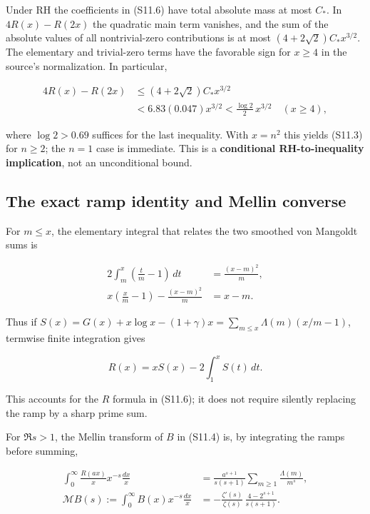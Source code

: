 \documentclass[
  10pt,
  a4paper,
  10pt,
  oneside,
  openany]{book}
\begin{document}
Under RH the coefficients in (S11.6) have total absolute mass at most
\(C_*\). In \(4R(x)-R(2x)\) the quadratic main term vanishes, and the
sum of the absolute values of all nontrivial-zero contributions is at
most \((4+2\sqrt2)C_*x^{3/2}\). The elementary and trivial-zero terms
have the favorable sign for \(x\ge4\) in the source's normalization. In
particular,

\[
\begin{aligned}
4R(x)-R(2x)
 &\le (4+2\sqrt2)C_*x^{3/2}\\
 &<6.83(0.047)x^{3/2}
 <\frac{\log2}{2}\,x^{3/2}
 \quad(x\ge4),
\end{aligned}
\tag{S11.10}\label{eq:S11.10}
\]

where \(\log2>0.69\) suffices for the last inequality. With \(x=n^2\)
this yields (S11.3) for \(n\ge2\); the \(n=1\) case is immediate. This
is a \textbf{conditional RH-to-inequality implication}, not an
unconditional bound.

\subsection{The exact ramp identity and Mellin
converse}\label{the-exact-ramp-identity-and-mellin-converse}

For \(m\le x\), the elementary integral that relates the two smoothed
von Mangoldt sums is

\[
\begin{aligned}
2\int_m^x\left(\frac{t}{m}-1\right)\,dt
 &=\frac{(x-m)^2}{m},\\
x\left(\frac{x}{m}-1\right)
 -\frac{(x-m)^2}{m}&=x-m.
\end{aligned}
\tag{S11.11}\label{eq:S11.11}
\]

Thus if
\(S(x)=G(x)+x\log x-(1+\gamma)x=\sum_{m\le x}\Lambda(m)(x/m-1)\),
termwise finite integration gives

\[
R(x)=xS(x)-2\int_1^x S(t)\,dt.
\tag{S11.12}\label{eq:S11.12}
\]

This accounts for the \(R\) formula in (S11.6); it does not require
silently replacing the ramp by a sharp prime sum.

For \(\Re s>1\), the Mellin transform of \(B\) in (S11.4) is, by
integrating the ramps before summing,

\[
\begin{aligned}
\int_0^\infty\frac{R(ax)}{x}x^{-s}\frac{dx}{x}
 &=\frac{a^{s+1}}{s(s+1)}\sum_{m\ge1}\frac{\Lambda(m)}{m^s},\\
\mathcal MB(s):=\int_0^\infty B(x)x^{-s}\frac{dx}{x}
 &=-\frac{\zeta'(s)}{\zeta(s)}\,
 \frac{4-2^{s+1}}{s(s+1)}.
\end{aligned}
\tag{S11.13}\label{eq:S11.13}
\]
\end{document}
